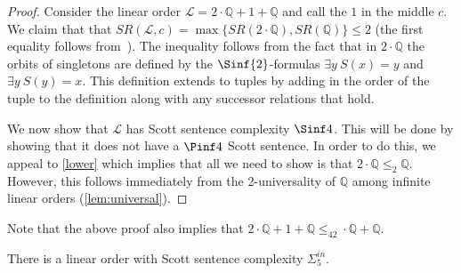 \documentclass{amsart}
\newcommand{\SR}{SR}
\newcommand{\Q}{\mathbb{Q}}
\renewcommand{\L}{\mathcal{L}}
\begin{document}
\begin{proof}
Consider the linear order $\L=2\cdot\Q+1+\Q$ and call the $1$ in the middle $c$.
We claim that that $\SR(\L,c)=\max\{\SR(2\cdot\Q),\SR(\Q)\}\leq2$ (the first equality
follows from~\cite[Lemma 11]{GM23}). The inequality follows from the fact that
in $2\cdot\Q$ the orbits of singletons are defined by the $\Sinf{2}$-formulas $\exists y\
S(x)=y$ and $\exists y\ S(y)=x$. This definition extends to tuples by adding in
the order of the tuple to the definition along with any successor relations that hold.

We now show that $\L$ has Scott sentence complexity $\Sinf4$.
This will be done by showing that it does not have a $\Pinf4$ Scott sentence. 
In order to do this, we appeal to \cref{lower} which implies that all we need to show is that $2\cdot\Q\leq_2\Q$.
However, this follows immediately from the 2-universality of $\Q$ among infinite
linear orders (\cref{lem:universal}).
\end{proof}

Note that the above proof also implies that $2\cdot\Q+1+\Q\leq_42\cdot\Q+\Q$.

\begin{theorem}
There is a linear order with Scott sentence complexity $\Sigma_5^{in}$.
\end{theorem}
\end{document}
